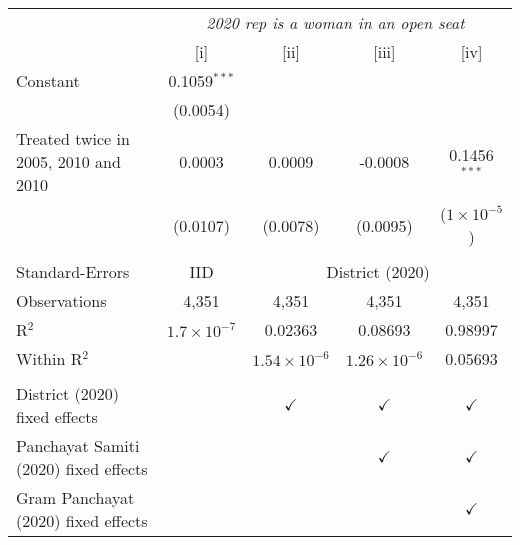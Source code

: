 
\begingroup
\centering
\begin{tabular}{lcccc}
   \toprule
    & \multicolumn{4}{c}{\textit{2020 rep is a woman in an open seat}}\\
                                         & [i]                  & [ii]                  & [iii]                 & [iv]\\  
   \midrule 
   Constant                              & 0.1059$^{***}$       &                       &                       &   \\   
                                         & (0.0054)             &                       &                       &   \\   
   Treated twice in 2005, 2010 and 2010  & 0.0003               & 0.0009                & -0.0008               & 0.1456$^{***}$\\   
                                         & (0.0107)             & (0.0078)              & (0.0095)              & ($1\times 10^{-5}$)\\    
    \\
   Standard-Errors & IID & \multicolumn{3}{c}{District (2020)} \\ 
   Observations                          & 4,351                & 4,351                 & 4,351                 & 4,351\\  
   R$^2$                                 & $1.7\times 10^{-7}$  & 0.02363               & 0.08693               & 0.98997\\  
   Within R$^2$                          &                      & $1.54\times 10^{-6}$  & $1.26\times 10^{-6}$  & 0.05693\\  
    \\
   District (2020) fixed effects         &                      & $\checkmark$          & $\checkmark$          & $\checkmark$\\   
   Panchayat Samiti (2020) fixed effects &                      &                       & $\checkmark$          & $\checkmark$\\   
   Gram Panchayat (2020) fixed effects   &                      &                       &                       & $\checkmark$\\   
   \bottomrule
\end{tabular}
\par\endgroup


